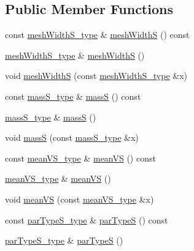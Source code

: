 \subsection*{Public Member Functions}
\begin{DoxyCompactItemize}
\item 
const \hyperlink{classsphere__t_a82740a9c5aa0437d973ee3e3caad09ea}{mesh\-Width\-S\-\_\-type} \& \hyperlink{classsphere__t_a9efdb161d54810e89ef2a010ed1376f4}{mesh\-Width\-S} () const 
\item 
\hyperlink{classsphere__t_a82740a9c5aa0437d973ee3e3caad09ea}{mesh\-Width\-S\-\_\-type} \& \hyperlink{classsphere__t_a9741af55612da53eee6b11a1fec1cb16}{mesh\-Width\-S} ()
\item 
void \hyperlink{classsphere__t_ae821ba92b7006cd377cac571a048e970}{mesh\-Width\-S} (const \hyperlink{classsphere__t_a82740a9c5aa0437d973ee3e3caad09ea}{mesh\-Width\-S\-\_\-type} \&x)
\item 
const \hyperlink{classsphere__t_a317ddc20b1a4fa225c55721bf12c67b2}{mass\-S\-\_\-type} \& \hyperlink{classsphere__t_ad1d8b8b0a1ac734212813443f1e087a0}{mass\-S} () const 
\item 
\hyperlink{classsphere__t_a317ddc20b1a4fa225c55721bf12c67b2}{mass\-S\-\_\-type} \& \hyperlink{classsphere__t_a8bb8b56feb0945ced66851fd3af21ad1}{mass\-S} ()
\item 
void \hyperlink{classsphere__t_a4e110b3ef5cec4e6d7155bb7c3baf374}{mass\-S} (const \hyperlink{classsphere__t_a317ddc20b1a4fa225c55721bf12c67b2}{mass\-S\-\_\-type} \&x)
\item 
const \hyperlink{classsphere__t_a351152e9b83bac409a627037b99a209b}{mean\-V\-S\-\_\-type} \& \hyperlink{classsphere__t_af033b8cf25e864785286a1ccba31d5e0}{mean\-V\-S} () const 
\item 
\hyperlink{classsphere__t_a351152e9b83bac409a627037b99a209b}{mean\-V\-S\-\_\-type} \& \hyperlink{classsphere__t_ac7f3a00d769319887393d0aefc126345}{mean\-V\-S} ()
\item 
void \hyperlink{classsphere__t_a98b3b69c7b1ade7fbd80b45111700905}{mean\-V\-S} (const \hyperlink{classsphere__t_a351152e9b83bac409a627037b99a209b}{mean\-V\-S\-\_\-type} \&x)
\item 
const \hyperlink{classsphere__t_a750fe86f76f8c344ccb25e7dc73c2655}{par\-Type\-S\-\_\-type} \& \hyperlink{classsphere__t_a19629575da8610678cb7ffcee3ab1ad7}{par\-Type\-S} () const 
\item 
\hyperlink{classsphere__t_a750fe86f76f8c344ccb25e7dc73c2655}{par\-Type\-S\-\_\-type} \& \hyperlink{classsphere__t_a361536ba34787a6e2b028edb1b63e0e4}{par\-Type\-S} ()

\end{DoxyCompactItemize}
